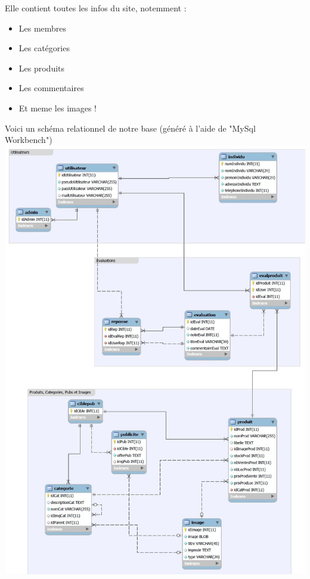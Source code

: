 Elle contient toutes les infos du site, notemment :
\begin{itemize}
	\item Les membres
	\item Les catégories
	\item Les produits
	\item Les commentaires
	\item Et meme les images !
\end{itemize}

Voici un schéma relationnel de notre base (généré à l'aide de "MySql Workbench")\\

\includegraphics[scale=0.5]{Images/dbob.jpg}	